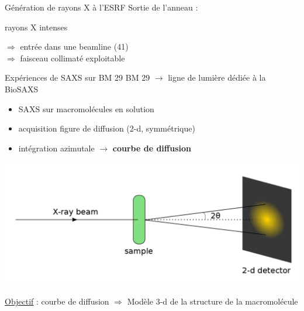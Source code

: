 \documentclass{beamer}
\begin{document}
\begin{frame}{G\'en\'eration de rayons X \`a l'ESRF}
Sortie de l'anneau :\\
\begin{minipage}{0.45\linewidth}
    \begin{center}
    \vspace{-0.8cm}
    rayons X intenses\\
    \end{center}
\end{minipage}
\begin{minipage}{0.50\linewidth}
    $\Rightarrow$ entr\'ee dans une beamline (41)\\
    $\Rightarrow$ faisceau collimat\'e exploitable\\
\end{minipage}
\end{frame}

\begin{frame}{Exp\'eriences de SAXS sur BM 29}
BM 29 $\rightarrow$ ligne de lumi\`ere d\'edi\'ee \`a la BioSAXS\\
\begin{itemize}
  \item SAXS sur macromol\'ecules en solution
  \item acquisition figure de diffusion (2-d, symm\'etrique)
  \item int\'egration azimutale $\rightarrow$ \textbf{courbe de diffusion}
\end{itemize}

\begin{minipage}{\linewidth}
    \begin{flushleft}
    \includegraphics[scale=0.2]{schemaSAXS.png}
    \end{flushleft}
\end{minipage}

\underline{Objectif} : courbe de diffusion $\Rightarrow$ Mod\`ele 3-d 
de la structure de la macromol\'ecule
\end{frame}
\end{document}
